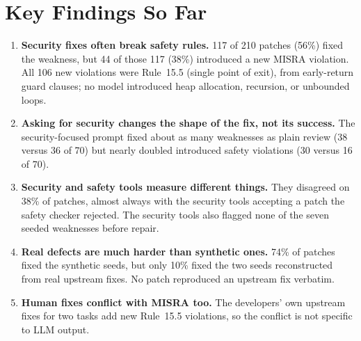 \documentclass[12pt]{article}
\begin{document}
\section{Key Findings So Far}
\begin{enumerate}[leftmargin=*]
    \item \textbf{Security fixes often break safety rules.} 117 of 210 patches (56\%) fixed the weakness, but 44 of those 117 (38\%) introduced a new MISRA violation. All 106 new violations were Rule~15.5 (single point of exit), from early-return guard clauses; no model introduced heap allocation, recursion, or unbounded loops.
    \item \textbf{Asking for security changes the shape of the fix, not its success.} The security-focused prompt fixed about as many weaknesses as plain review (38 versus 36 of 70) but nearly doubled introduced safety violations (30 versus 16 of 70).
    \item \textbf{Security and safety tools measure different things.} They disagreed on 38\% of patches, almost always with the security tools accepting a patch the safety checker rejected. The security tools also flagged none of the seven seeded weaknesses before repair.
    \item \textbf{Real defects are much harder than synthetic ones.} 74\% of patches fixed the synthetic seeds, but only 10\% fixed the two seeds reconstructed from real upstream fixes. No patch reproduced an upstream fix verbatim.
    \item \textbf{Human fixes conflict with MISRA too.} The developers' own upstream fixes for two tasks add new Rule~15.5 violations, so the conflict is not specific to LLM output.
\end{enumerate}
\end{document}

